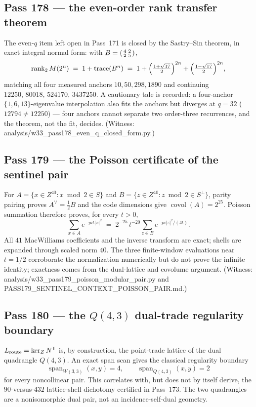 \documentclass[12pt,a4paper]{article}
\def\mathbb#1{#1}%
\def\texttt#1{#1}%
\def\pi{pi}%
\theoremstyle{definition}
\begin{document}
\subsection{Pass 178 --- the even-order rank transfer theorem}
\label{ssec:pass178}

The even-$q$ item left open in Pass~171 is closed by the Sastry--Sin
theorem, in exact integral normal form: with
$B=\begin{psmallmatrix}4&2\\2&5\end{psmallmatrix}$,
\[
  \operatorname{rank}_2M(2^n)\;=\;1+\operatorname{trace}(B^n)
  \;=\;1+\Bigl(\tfrac{1+\sqrt{17}}2\Bigr)^{2n}
  +\Bigl(\tfrac{1-\sqrt{17}}2\Bigr)^{2n},
\]
matching all four measured anchors $10,50,298,1890$ and continuing
$12250,\,80018,\,524170,\,3437250$. A cautionary tale is recorded: a
four-anchor $\{1,6,13\}$-eigenvalue interpolation also fits the anchors
but diverges at $q=32$ ($12794\ne12250$) --- four anchors cannot separate
two order-three recurrences, and the theorem, not the fit, decides.
(Witness: \texttt{analysis/w33\_pass178\_even\_q\_closed\_form.py}.)

\subsection{Pass 179 --- the Poisson certificate of the sentinel pair}
\label{ssec:pass179}

For
$A=\{x\in\mathbb Z^{40}:x\bmod2\in S\}$ and
$B=\{z\in\mathbb Z^{40}:z\bmod2\in S^\perp\}$, parity pairing proves
$A^\vee=\tfrac12B$ and the code dimensions give
$\operatorname{covol}(A)=2^{25}$.  Poisson summation therefore proves,
for every $t>0$,
\[
  \sum_{x\in A}e^{-\pi t|x|^2}
  \;=\;2^{-25}\,t^{-20}\sum_{z\in B}e^{-\pi|z|^2/(4t)}.
\]
All $41$ MacWilliams coefficients and the inverse transform are exact;
shells are expanded through scaled norm $40$.  The three finite-window
evaluations near $t=1/2$ corroborate the normalization numerically but do not prove the infinite identity; exactness comes from the dual-lattice and
covolume argument.
(Witness: \texttt{analysis/w33\_pass179\_poisson\_modular\_pair.py} and
\texttt{PASS179\_SENTINEL\_CONTEXT\_POISSON\_PAIR.md}.)

\subsection{Pass 180 --- the $Q(4,3)$ dual-trade regularity boundary}
\label{ssec:pass180}

$L_{\rm route}=\ker_{\mathbb Z}N^{\mathsf T}$ is, by construction, the
point-trade lattice of the dual quadrangle $Q(4,3)$.  An exact span scan
gives the classical regularity boundary
\[
\operatorname{span}_{W(3,3)}(x,y)=4,
\qquad
\operatorname{span}_{Q(4,3)}(x,y)=2
\]
for every noncollinear pair.  This correlates with, but does not by itself
derive, the $90$-versus-$432$ lattice-shell dichotomy certified in
Pass~173.  The two quadrangles are a nonisomorphic dual pair, not an
incidence-self-dual geometry.
\end{document}
